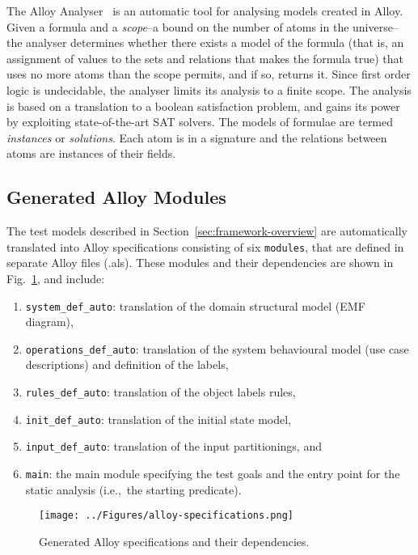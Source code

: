 The Alloy Analyser~\cite{Jackson2000} is an automatic tool for analysing models created in Alloy. Given a formula and a \textit{scope}--a bound on the number of atoms in the universe--the analyser determines whether there exists a model of the formula (that is, an assignment of values to the sets and relations that makes the formula true) that uses no more atoms than the scope permits, and if so, returns it. Since first order logic is undecidable, the analyser limits its analysis to a finite scope. The analysis is based on a translation to a boolean satisfaction problem, and gains its power by exploiting state-of-the-art SAT solvers. The models of formulae are termed \textit{instances} or \textit{solutions}. Each atom is in a signature and the relations between atoms are instances of their fields.

\subsection{Generated Alloy Modules}
\label{sec:test-generation-execution-alloy-models}
The test models described in Section~\ref{sec:framework-overview} are automatically translated into Alloy specifications consisting of six \texttt{modules}, that are defined in separate Alloy files (.als). These modules and their dependencies are shown in Fig.~\ref{fig:alloy-specifications}, and include:

\begin{enumerate}
	\item \texttt{system\_def\_auto}: translation of the domain structural model (EMF diagram),
	\item \texttt{operations\_def\_auto}: translation of the system behavioural model (use case descriptions) and definition of the labels,
	\item \texttt{rules\_def\_auto}: translation of the object labels rules,
	\item \texttt{init\_def\_auto}: translation of the initial state model, 
	\item \texttt{input\_def\_auto}: translation of the input partitionings, and
	\item \texttt{main}: the main module specifying the test goals and the entry point for the static analysis (i.e.,\ the starting predicate).
\end{enumerate}

\begin{figure}[h]
\centering
\texttt{[image: ../Figures/alloy-specifications.png]}
\caption{Generated Alloy specifications and their dependencies.}
\label{fig:alloy-specifications}
\end{figure}

